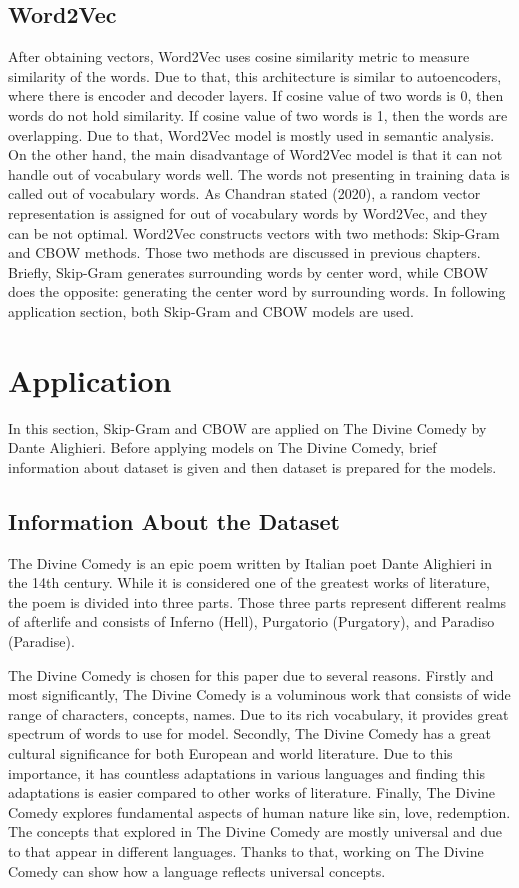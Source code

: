 \documentclass[man]{apa7}
\begin{document}
\subsection{Word2Vec}

After obtaining vectors, Word2Vec uses cosine similarity metric to measure similarity of the words. Due to that, this architecture is similar to autoencoders, where there is encoder and decoder layers. If cosine value of two words is 0, then words do not hold similarity. If cosine value of two words  is 1, then the words are overlapping. Due to that, Word2Vec model is mostly used in semantic analysis. On the other hand, the main disadvantage of Word2Vec model is that it can not handle out of vocabulary words well. The words not presenting in training data is called out of vocabulary words.  As Chandran stated (2020), a random vector representation is assigned for out of vocabulary words by Word2Vec, and they can be not optimal. Word2Vec constructs vectors with two methods: Skip-Gram and CBOW methods. Those two methods are discussed in previous chapters. Briefly, Skip-Gram generates surrounding words by center word, while CBOW does the opposite: generating the center word by surrounding words. In following application section, both Skip-Gram and CBOW models are used.

\section{Application}

In this section, Skip-Gram and CBOW are applied on The Divine Comedy by Dante Alighieri. Before applying models on The Divine Comedy, brief information about dataset is given and then dataset is prepared for the models.

\subsection{Information About the Dataset}

The Divine Comedy is an epic poem written by Italian poet Dante Alighieri in the 14th century. While it is considered one of the greatest works of literature, the poem is divided into three parts. Those three parts represent different realms of afterlife and consists of Inferno (Hell), Purgatorio (Purgatory), and Paradiso (Paradise).

The Divine Comedy is chosen for this paper due to several reasons. Firstly and most significantly, The Divine Comedy is a voluminous work that consists of wide range of characters, concepts, names. Due to its rich vocabulary, it provides great spectrum of words to use for model. Secondly, The Divine Comedy has a great cultural significance for both European and world literature. Due to this importance, it has countless adaptations in various languages and finding this adaptations is easier compared to other works of literature. Finally, The Divine Comedy explores fundamental aspects of human nature like sin, love, redemption. The concepts that explored in The Divine Comedy are mostly universal and due to that appear in different languages. Thanks to that, working on The Divine Comedy can show how a language reflects universal concepts.
\end{document}
